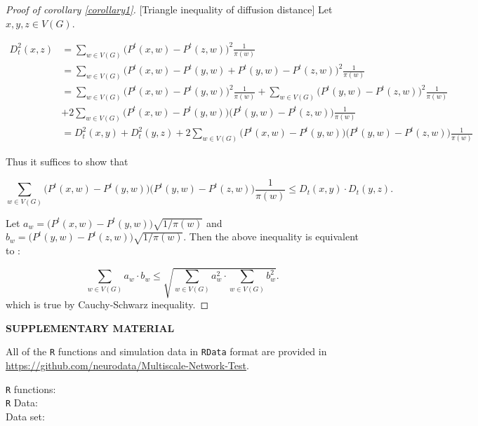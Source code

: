 \documentclass[12pt]{article}
\theoremstyle{definition}
\begin{document}
\begin{proof}[Proof of corollary \ref{corollary1}][Triangle inequality of diffusion distance]
Let $x, y, z \in V(G).$
	
\begin{equation}
\begin{split}
D^{2}_{t}(x,z) & = \sum\limits_{w \in V(G)} \big( P^{t}(x,w) - P^{t}(z,w)   \big)^2 \frac{1}{\pi(w)}  \\ & = \sum\limits_{w \in V(G)} \big(P^{t}(x, w) - P^{t}(y,w) + P^{t}(y,w) - P^{t}(z,w) \big)^2 \frac{1}{\pi(w)} \\ & = \sum\limits_{w \in V(G)} \big( P^{t}(x,w) - P^{t}(y,w) \big)^2 \frac{1}{\pi(w)}  + \sum\limits_{w \in V(G)} \big( P^{t}(y,w) - P^{t}(z,w)  \big)^2 \frac{1}{\pi(w)} \\ & + 2 \sum\limits_{w \in V(G)} \big( P^{t}(x,w) - P^{t}(y,w)  \big) \big( P^{t}(y,w) - P^{t}(z,w)  \big)\frac{1}{\pi(w)} \\ &= D^{2}_{t}(x,y) + D^{2}_{t}(y,z) +  2 \sum\limits_{w \in V(G)} \big( P^{t}(x,w) - P^{t}(y,w)  \big) \big( P^{t}(y,w) - P^{t}(z,w)  \big)\frac{1}{\pi(w)}   
\end{split}
\end{equation}
	
	
Thus it suffices to show that 
	
\begin{equation}
\sum\limits_{w \in V(G)} \big( P^{t}(x,w) - P^{t}(y,w)  \big) \big( P^{t}(y,w) - P^{t}(z,w)  \big)\frac{1}{\pi(w)} \leq D_{t}(x,y) \cdot D_{t}(y,z). 
\end{equation}
	
Let $a_{w} = \big(P^{t}(x,w) - P^{t}(y,w) \big) \sqrt{1 / \pi(w)}$ and $b_{w} = \big( P^{t}(y,w) - P^{t}(z,w) \big) \sqrt{1 / \pi(w)}$. Then the above inequality is equivalent to :
	
\begin{equation} 
\sum\limits_{w \in V(G)} a_{w} \cdot b_{w} \leq \sqrt{\sum\limits_{w \in V(G)} a^2_{w} \cdot \sum\limits_{w \in V(G)} b^2_{w} }.
\end{equation}
which is true by Cauchy-Schwarz inequality.
\end{proof}	
	


	
\newpage
\bigskip
\begin{center}
	{\large\bf SUPPLEMENTARY MATERIAL}
\end{center}
	
All of the \texttt{R} functions and simulation data in \texttt{RData} format are provided in \url{https://github.com/neurodata/Multiscale-Network-Test}.
	
\begin{description}
		
\item[\texttt{R} functions:] 
		
		
\item[\texttt{R} Data:] 
		
\item[Data set:]


 
\end{description}
	
	
\end{document}
